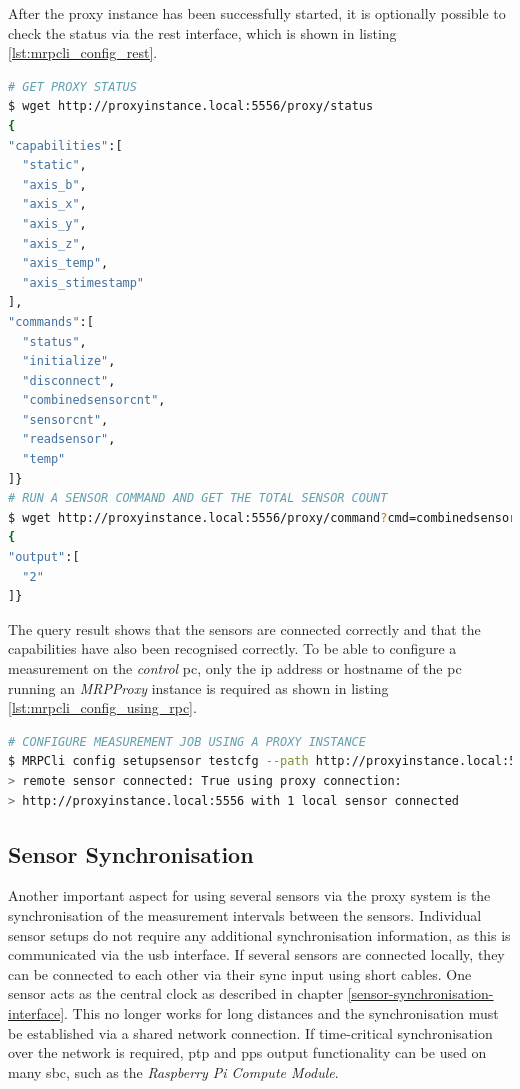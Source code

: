 After the proxy instance has been successfully started, it is optionally
possible to check the status via the \gls{rest} interface, which is
shown in listing \ref{lst:mrpcli_config_rest}.

\begin{lstlisting}[language=bash, caption={MRPProxy provided REST endpoint query example using wget command line tool to send requests}, label=lst:mrpcli_config_rest]
# GET PROXY STATUS
$ wget http://proxyinstance.local:5556/proxy/status
{
"capabilities":[
  "static",
  "axis_b",
  "axis_x",
  "axis_y",
  "axis_z",
  "axis_temp",
  "axis_stimestamp"
],
"commands":[
  "status",
  "initialize",
  "disconnect",
  "combinedsensorcnt",
  "sensorcnt",
  "readsensor",
  "temp"
]}
# RUN A SENSOR COMMAND AND GET THE TOTAL SENSOR COUNT
$ wget http://proxyinstance.local:5556/proxy/command?cmd=combinedsensorcnt
{
"output":[
  "2"
]}
\end{lstlisting}

The query result shows that the sensors are connected correctly and that
the capabilities have also been recognised correctly. To be able to
configure a measurement on the \emph{control} \gls{pc}, only the
\gls{ip} address or hostname of the \gls{pc} running an \emph{MRPProxy}
instance is required as shown in listing
\ref{lst:mrpcli_config_using_rpc}.

\begin{lstlisting}[language=bash, caption={MRPcli usage example to connect with a MRPProxy based network sensor}, label=lst:mrpcli_config_using_rpc]
# CONFIGURE MEASUREMENT JOB USING A PROXY INSTANCE
$ MRPCli config setupsensor testcfg --path http://proxyinstance.local:5556
> remote sensor connected: True using proxy connection:
> http://proxyinstance.local:5556 with 1 local sensor connected
\end{lstlisting}

\hypertarget{sensor-synchronisation}{%
\subsection{Sensor Synchronisation}\label{sensor-synchronisation}}

Another important aspect for using several sensors via the proxy system
is the synchronisation of the measurement intervals between the sensors.
Individual sensor setups do not require any additional synchronisation
information, as this is communicated via the \gls{usb} interface. If
several sensors are connected locally, they can be connected to each
other via their sync input using short cables. One sensor acts as the
central clock as described in chapter
\ref{sensor-synchronisation-interface}. This no longer works for long
distances and the synchronisation must be established via a shared
network connection. If time-critical synchronisation over the network is
required, \gls{ptp} and \gls{pps} output functionality 
can be used on many \gls{sbc}, such as the \emph{Raspberry Pi Compute
Module}.

